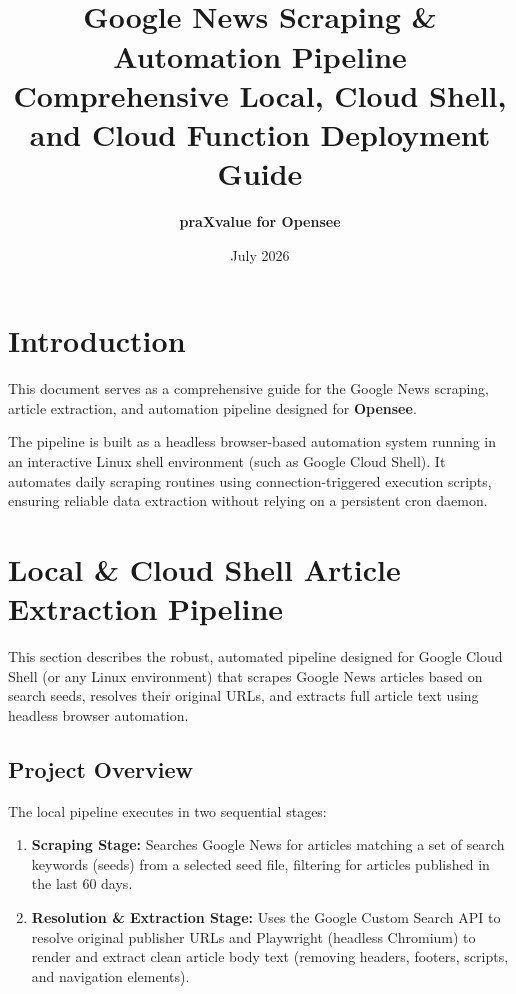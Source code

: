 \documentclass[11pt,a4paper]{article}
\title{
    \vspace{2in}
    \HRule \\[0.4cm]
    \Huge \textbf{Google News Scraping \& Automation Pipeline} \\[0.2cm]
    \large \textbf{Comprehensive Local, Cloud Shell, and Cloud Function Deployment Guide}
    \HRule \\[1.5cm]
}
\author{\textbf{praXvalue for Opensee}}
\date{July 2026}
\begin{document}
\clearpage
\maketitle
\thispagestyle{empty}
\clearpage

\tableofcontents
\thispagestyle{empty}
\clearpage

\setcounter{page}{1}

\section{Introduction}
This document serves as a comprehensive guide for the Google News scraping, article extraction, and automation pipeline designed for \textbf{Opensee}. 

The pipeline is built as a headless browser-based automation system running in an interactive Linux shell environment (such as Google Cloud Shell). It automates daily scraping routines using connection-triggered execution scripts, ensuring reliable data extraction without relying on a persistent cron daemon.

\newpage

\section{Local \& Cloud Shell Article Extraction Pipeline}
\label{sec:local_pipeline}

This section describes the robust, automated pipeline designed for Google Cloud Shell (or any Linux environment) that scrapes Google News articles based on search seeds, resolves their original URLs, and extracts full article text using headless browser automation.

\subsection{Project Overview}
The local pipeline executes in two sequential stages:
\begin{enumerate}
    \item \textbf{Scraping Stage:} Searches Google News for articles matching a set of search keywords (seeds) from a selected seed file, filtering for articles published in the last 60 days.
    \item \textbf{Resolution \& Extraction Stage:} Uses the Google Custom Search API to resolve original publisher URLs and Playwright (headless Chromium) to render and extract clean article body text (removing headers, footers, scripts, and navigation elements).
\end{enumerate}
\end{document}
